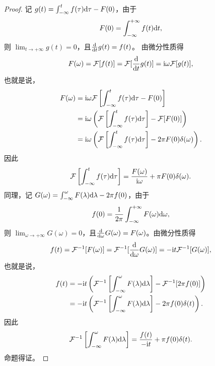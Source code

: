 \begin{proof}
    记 $g(t) = \int_{-\infty}^{t}f(\tau)\mathrm{d}\tau - F(0)$，由于
    \begin{align*}
        F(0) = \int_{-\infty}^{+\infty}f(t)\mathrm{d}t,
    \end{align*}
    则 $\lim_{t \to +\infty}g(t) = 0$，且$\frac{\D}{\D{t}}g(t) = f(t)$。
    由微分性质得
    \begin{align*}
        F(\omega) = \mathcal{F}[f(t)] = \mathcal{F}[\frac{\D}{\D{t}}g(t)] = \mathi \omega \mathcal{F}[g(t)],
    \end{align*}
    也就是说，
    \begin{align*}
        F(\omega) & = \mathrm{i} \omega \mathcal{F}\left[\int_{-\infty}^{t}f(\tau)\mathrm{d}\tau - F(0)\right] \\
        & = \mathrm{i} \omega \left(\mathcal{F}\left[\int_{-\infty}^{t}f(\tau)\mathrm{d}\tau\right] - \mathcal{F}[F(0)]\right) \\
        & = \mathrm{i} \omega \left(\mathcal{F}\left[\int_{-\infty}^{t}f(\tau)\mathrm{d}\tau\right] - 2\pi F(0)\delta(\omega)\right).
    \end{align*}
    因此
    \begin{align*}
        \mathcal{F}\left[\int_{-\infty}^{t}f(\tau)\mathrm{d}\tau\right] = \frac{F(\omega)}{\mathrm{i}\omega} + \pi F(0)\delta(\omega).
    \end{align*}
    同理，记 $G(\omega) = \int_{-\infty}^{\omega}F(\lambda)\mathrm{d}\lambda - 2\pi f(0)$，由于
    \begin{align*}
        f(0) = \frac{1}{2\pi}\int_{-\infty}^{+\infty}F(\omega)\mathrm{d}\omega,
    \end{align*}
    则 $\lim_{\omega \to +\infty}G(\omega) = 0$，且$\frac{\D}{\D{\omega}}G(\omega) = F(\omega)$。由微分性质得
    \begin{align*}
        f(t) = \mathcal{F}^{-1}[F(\omega)] = \mathcal{F}^{-1}[\frac{\D}{\D{\omega}}G(\omega)] = -\mathi t \mathcal{F}^{-1}[G(\omega)],
    \end{align*}
    也就是说，
    \begin{align*}
        f(t) & = -\mathrm{i} t \left(\mathcal{F}^{-1}\left[\int_{-\infty}^{\omega}F(\lambda)\mathrm{d}\lambda\right] - \mathcal{F}^{-1}[2\pi f(0)]\right) \\
        & = -\mathrm{i} t \left(\mathcal{F}^{-1}\left[\int_{-\infty}^{\omega}F(\lambda)\mathrm{d}\lambda\right] - 2\pi f(0)\delta(t)\right).
    \end{align*}
    因此
    \begin{align*}
        \mathcal{F}^{-1}\left[\int_{-\infty}^{\omega}F(\lambda)\mathrm{d}\lambda\right] = \frac{f(t)}{-\mathrm{i} t} + \pi f(0)\delta(t).
    \end{align*}
    命题得证。
\end{proof}

